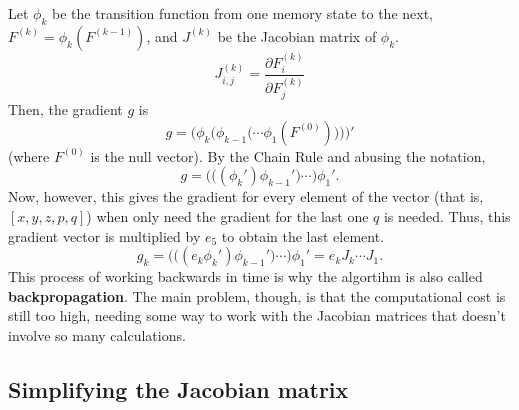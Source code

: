 \documentclass[titlepage]{article}
\theoremstyle{plain}
\theoremstyle{definition}
\begin{document}
		Let $\phi_k$ be the transition function from one memory state to the next, $F^{(k)}=\phi_k(F^{(k-1)})$, and $J^{(k)}$ be the Jacobian matrix of $\phi_k$. 
		$$
		J^{(k)}_{i,j}=\frac{\partial F^{(k)}_i}{\partial F^{(k)}_j}
		$$
		Then, the gradient $g$ is\\
		$$
			g = \bigg(\phi_k\Big(\phi_{k-1}\big(\cdots\phi_1(F^{(0)})\big)\Big)\bigg)'
		$$
		(where $F^{(0)}$ is the null vector). By the Chain Rule and abusing the notation,
		$$
			g = \Big(\big((\phi_{k}')\phi_{k-1}'\big)\cdots\Big)\phi_{1}'.
		$$
		Now, however, this gives the gradient for every element of the vector (that is, $[x,y,z,p,q]$) when only need the gradient for the last one $q$ is needed. Thus, this gradient vector is multiplied by $e_5$ to obtain the last element.
		$$
			g_k = \Big(\big((e_k\phi_{k}')\phi_{k-1}'\big)\cdots\Big)\phi_{1}'=e_k J_k \cdots J_1.
		$$
		This process of working backwards in time is why the algortihm is also called {\bf backpropagation}. The main problem, though, is that the computational cost is still too high, needing some way to work with the Jacobian matrices that doesn't involve so many calculations.
		
		\subsection{Simplifying the Jacobian matrix} \label{SimpleJacobMat}
		
\end{document}
